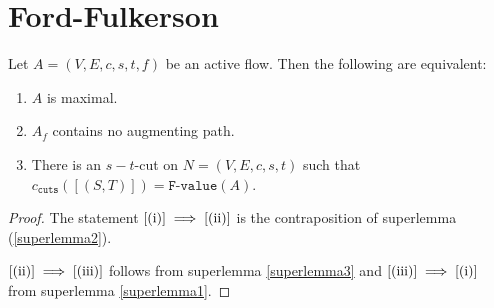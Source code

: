 \documentclass{article}
\begin{document}
\section{Ford-Fulkerson}
\begin{sats}
    Let $A=(V, E, c, s, t, f)$ be an active flow. Then the following are equivalent:
    \begin{enumerate}[label = (\roman*)]
        \item\label{(i)} $A$ is maximal.
        \item\label{(ii)} $A_f$ contains no augmenting path.
        \item\label{(iii)} There is an $s-t$-cut on $N=(V, E, c, s, t)$ such that $c_{\texttt{cuts}}([(S, T)]) = \texttt{F-value}(A)$.
    \end{enumerate}
\end{sats}
\begin{proof}
    The statement $\ref{(i)} \implies \ref{(ii)}$ is the contraposition of superlemma (\ref{superlemma2}).

    $\ref{(ii)} \implies \ref{(iii)}$ follows from superlemma \ref{superlemma3} and $\ref{(iii)} \implies \ref{(i)}$ from superlemma \ref{superlemma1}.
\end{proof}
\end{document}
